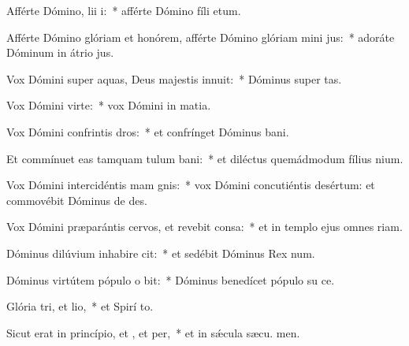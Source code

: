 \item Afférte Dómino, lii i:~* afférte Dómino fíli etum.
\item Afférte Dómino glóriam et honórem, afférte Dómino glóriam mini jus:~* adoráte Dóminum in átrio  jus.
\item Vox Dómini super aquas, Deus majestis innuit:~* Dóminus super  tas.
\item Vox Dómini  virte:~* vox Dómini in matia.
\item Vox Dómini confrintis dros:~* et confrínget Dóminus  bani.
\item Et commínuet eas tamquam tulum bani:~* et diléctus quemádmodum fílius nium.
\item Vox Dómini intercidéntis mam gnis:~* vox Dómini concutiéntis desértum: et commovébit Dóminus de des.
\item Vox Dómini præparántis cervos, et revebit consa:~* et in templo ejus omnes  riam.
\item Dóminus dilúvium inhabire cit:~* et sedébit Dóminus Rex  num.
\item Dóminus virtútem pópulo o bit:~* Dóminus benedícet pópulo su  ce.
\item Glória tri, et lio,~* et Spirí to.
\item Sicut erat in princípio, et , et per,~* et in sǽcula sæcu. men.

